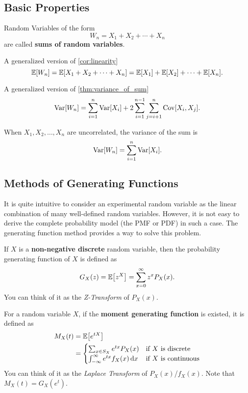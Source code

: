 \subsection{Basic Properties}
\begin{definition}
    Random Variables of the form
    \[W_n=X_1+X_2+\cdots+X_n\]
    are called \textbf{sums of random variables}.
\end{definition}

\begin{theorem}
    A generalized version of \cref{cor:linearity}
    \[\E{W_n}=\E{X_1+X_2+\cdots+X_n}=\E{X_1}+\E{X_2}+\cdots+\E{X_n}.\]
\end{theorem}

\begin{theorem}
    A generalized version of \cref{thm:variance_of_sum}
    \[\mathop{\mathrm{Var}}\nolimits[W_n]=\sum_{i=1}^{n}\mathop{\mathrm{Var}}\nolimits[X_i]+2\sum_{i=1}^{n-1}\sum_{j=i+1}^{n}\mathop{\mathrm{Cov}}\nolimits[X_i,X_j].\]
\end{theorem}

\begin{corollary}
    When $X_1,X_2,\ldots,X_n$ are uncorrelated, the variance of the sum is
    \[\mathop{\mathrm{Var}}\nolimits[W_n]=\sum_{i=1}^{n}\mathop{\mathrm{Var}}\nolimits[X_i].\]
\end{corollary}

\subsection{Methods of Generating Functions}
It is quite intuitive to consider an experimental random variable as the linear combination of many well-defined random variables. However, it is not easy to derive the complete probability model (\ie the \textnormal{PMF} or \textnormal{PDF}) in such a case. The generating function method provides a way to solve this problem.
\begin{definition}
    If $X$ is a \textbf{non-negative discrete} random variable, then the probability generating function of $X$ is defined as
    \[G_X(z)=\E{z^X}=\sum_{x=0}^{\infty}z^xP_X(x).\]
    You can think of it as the \textit{Z-Transform} of $P_X(x)$.
\end{definition}

\begin{definition}
    For a random variable $X$, if the \textbf{moment generating function} is existed, it is defined as
    \begin{align*}
        M_X(t)&=\E{e^{tX}}\\
        &=\begin{cases}
            \sum_{x\in S_X}e^{tx}P_X(x) & \text{if $X$ is discrete}\\
            \int_{-\infty}^{\infty}e^{tx}f_X(x)\diff x & \text{if $X$ is continuous}
        \end{cases}
    \end{align*}
    You can think of it as the \textit{Laplace Transform} of $P_X(x)$/$f_X(x)$. Note that $M_X(t)=G_X(e^t)$.
\end{definition}

